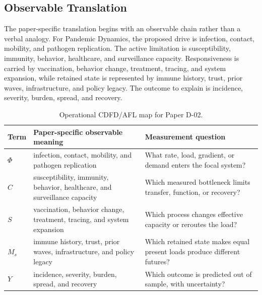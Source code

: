 \documentclass[11pt,a4paper]{article}
\begin{document}
\subsection{Observable Translation}

The paper-specific translation begins with an observable chain rather than a
verbal analogy. For Pandemic Dynamics, the proposed drive is infection, contact, mobility, and pathogen replication.
The active limitation is susceptibility, immunity, behavior, healthcare, and surveillance capacity. Responsiveness is carried by
vaccination, behavior change, treatment, tracing, and system expansion, while retained state is represented by
immune history, trust, prior waves, infrastructure, and policy legacy. The outcome to explain is incidence, severity, burden, spread, and recovery.

\begin{table}[htbp]
\centering
\small
\caption{Operational CDFD/AFL map for Paper D-02.}
\begin{tabularx}{\textwidth}{|l|X|X|}
\hline
\textbf{Term} & \textbf{Paper-specific observable meaning} & \textbf{Measurement question} \\
\hline
$\Phi$ & infection, contact, mobility, and pathogen replication & What rate, load, gradient, or demand enters the focal system? \\
\hline
$C$ & susceptibility, immunity, behavior, healthcare, and surveillance capacity & Which measured bottleneck limits transfer, function, or recovery? \\
\hline
$S$ & vaccination, behavior change, treatment, tracing, and system expansion & Which process changes effective capacity or reroutes the load? \\
\hline
$M_s$ & immune history, trust, prior waves, infrastructure, and policy legacy & Which retained state makes equal present loads produce different futures? \\
\hline
$Y$ & incidence, severity, burden, spread, and recovery & Which outcome is predicted out of sample, with uncertainty? \\
\hline
\end{tabularx}
\end{table}
\end{document}
